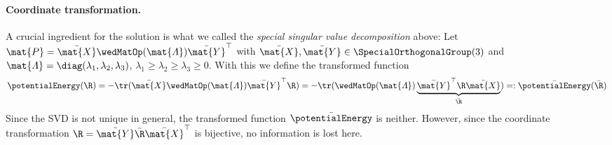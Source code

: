 \paragraph{Coordinate transformation.}
A crucial ingredient for the solution is what we called the \textit{special singular value decomposition} above:
Let $\mat{P} = \bar{\mat{X}} \wedMatOp(\mat{\varLambda}) \bar{\mat{Y}}^\top$ with $\bar{\mat{X}}, \bar{\mat{Y}} \in \SpecialOrthogonalGroup(3)$ and $\mat{\varLambda} = \diag(\lambda_1, \lambda_2, \lambda_3)$, $\lambda_1 \geq \lambda_2 \geq \lambda_3 \geq 0$.
With this we define the transformed function
\begin{align}
 \potentialEnergy(\R) = -\tr( \bar{\mat{X}} \wedMatOp(\mat{\varLambda}) \bar{\mat{Y}}^\top \R) = -\tr( \wedMatOp(\mat{\varLambda}) \underbrace{\bar{\mat{Y}}^\top \R \bar{\mat{X}}}_{\bar{\R}}) =: \bar{\potentialEnergy}(\bar{\R})
\end{align}
Since the SVD is not unique in general, the transformed function $\bar{\potentialEnergy}$ is neither.
However, since the coordinate transformation $\R = \bar{\mat{Y}} \bar{\R} \bar{\mat{X}}^\top$ is bijective, no information is lost here.

